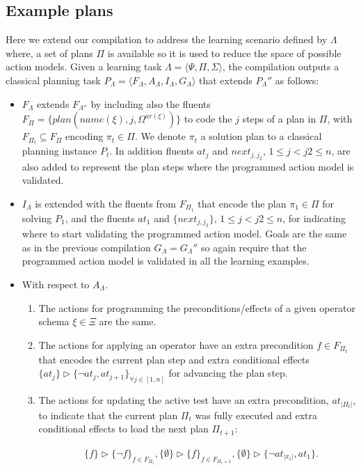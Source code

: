 \documentclass[letterpaper]{article} %
\newcommand{\tup}[1]{{\langle #1 \rangle}}
\begin{document}
\subsection{Example plans}
Here  we extend our compilation to address the learning scenario defined by $\Lambda$ where, a set of plans $\Pi$ is available so it is used to reduce the space of possible action models. Given a learning task $\Lambda=\tup{\Psi,\Pi,\Sigma}$, the compilation outputs a classical planning task $P_{\Lambda}=\tup{F_{\Lambda},A_{\Lambda},I_{\Lambda},G_{\Lambda}}$ that extends $P_{\Lambda}''$ as follows: 
\begin{itemize}
\item $F_{\Lambda}$ extends $F_{\Lambda''}$ by including also the fluents $F_{\Pi}=\{plan(name(\xi),j,\Omega^{ar(\xi)})\}$ to code the $j$ steps of a plan in $\Pi$, with $F_{\Pi_t}\subseteq F_{\Pi}$ encoding $\pi_t\in \Pi$. We denote $\pi_t$ a solution plan to a classical planning instance $P_t$. In addition fluents $at_j$ and $next_{j,j_2}$, {\small $1\leq j<j2\leq n$}, are also added to represent the plan steps where the programmed action model is validated.
\item $I_{\Lambda}$ is extended with the fluents from $F_{\Pi_1}$ that encode the plan $\pi_1\in \Pi$ for solving $P_1$, and the fluents $at_1$ and $\{next_{j,j_2}\}$, {\small $1\leq j<j2\leq n$}, for indicating where to start validating the programmed action model. Goals are the same as in the previous compilation $G_{\Lambda}=G_{\Lambda}''$ so again require that the programmed action model is validated in all  the learning examples.
\item With respect to $A_{\Lambda}$.
\begin{enumerate}
\item The actions for programming the preconditions/effects of a given operator schema $\xi\in\Xi$ are the same.
\item The actions for applying an operator have an extra precondition $f\in F_{\Pi_t}$ that encodes the current plan step and extra conditional effects $\{at_{j}\}\rhd\{\neg at_{j},at_{j+1}\}_{\forall j\in [1,n]}$ for advancing the plan step.
\item The actions for updating the active test have an extra precondition, $at_{|\Pi_t|}$, to indicate that the current plan $\Pi_t$ was fully executed and extra conditional effects to load the next plan $\Pi_{t+1}$:
\begin{small}
\begin{align*}
&\{f\}\rhd\{\neg f\}_{f\in F_{\Pi_t}}, \{\emptyset\}\rhd\{f\}_{f\in F_{\Pi_t+1}},\{\emptyset\}\rhd\{\neg at_{|\pi_t|},at_1\}.
\end{align*}
\end{small}
\end{enumerate}
\end{itemize}
\end{document}
